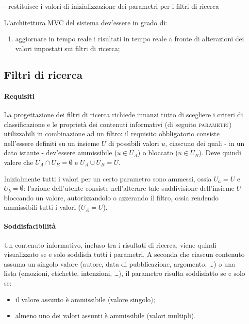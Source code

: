 - restituisce i valori di inizializzazione dei parametri per i filtri di ricerca

L'architettura MVC del sistema dev'essere in grado di: 
\begin{enumerate}
	\item aggiornare in tempo reale i risultati in tempo reale a fronte di alterazioni dei valori impostati sui filtri di ricerca; %
\end{enumerate}
 
\subsection{Filtri di ricerca}
\label{sec:tesi:stage:gui:filtri}
\paragraph{Requisiti}
La progettazione dei filtri di ricerca richiede innanzi tutto di scegliere i criteri di classificazione e le proprietà dei contenuti informativi (di seguito \textsc{parametri}) utilizzabili in combinazione ad un filtro: il requisito obbligatorio consiste nell'essere definiti su un insieme $U$ di possibili valori $u$, ciascuno dei quali - in un dato istante - dev'essere ammissibile ($u \in U_A$) o bloccato ($u \in U_B$). Deve quindi valere che $U_A \cap U_B = \emptyset$ e $U_A \cup U_B = U$.

Inizialmente tutti i valori per un certo parametro sono ammessi, ossia $U_a = U$ e $U_b = \emptyset$: l'azione dell'utente consiste nell'alterare tale suddivisione dell'insieme $U$ bloccando un valore, autorizzandolo o azzerando il filtro, ossia rendendo ammissibili tutti i valori ($U_A = U$).

\paragraph{Soddisfacibilità}
Un contenuto informativo, incluso tra i risultati di ricerca, viene quindi visualizzato se e solo soddisfa tutti i parametri. A seconda che ciascun contenuto assuma un singolo valore (autore, data di pubblicazione, argomento, \ldots) o una lista (emozioni, etichette, intenzioni, \ldots), il parametro risulta soddisfatto se e solo se:
\begin{itemize}
\item il valore assunto è ammissibile (valore singolo);
\item almeno uno dei valori assunti è ammissibile (valori multipli).
\end{itemize}

